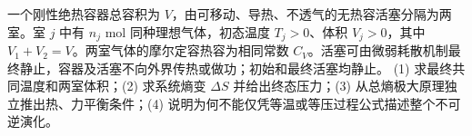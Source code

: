 一个刚性绝热容器总容积为 \(V\)，由可移动、导热、不透气的无热容活塞分隔为两室。室 \(j\) 中有 \(n_j\) mol 同种理想气体，初态温度 \(T_j>0\)、体积 \(V_j>0\)，其中 \(V_1+V_2=V\)。两室气体的摩尔定容热容为相同常数 \(C_V\)。活塞可由微弱耗散机制最终静止，容器及活塞不向外界传热或做功；初始和最终活塞均静止。
(1) 求最终共同温度和两室体积；(2) 求系统熵变 \(\Delta S\) 并给出终态压力；(3) 从总熵极大原理独立推出热、力平衡条件；(4) 说明为何不能仅凭等温或等压过程公式描述整个不可逆演化。
